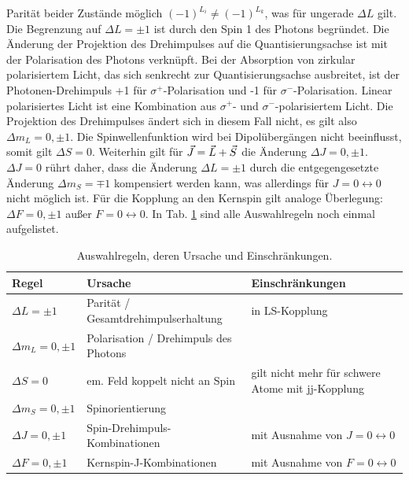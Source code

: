 Parität beider Zustände möglich $(-1)^{L_i}\neq(-1)^{L_k}$, was für ungerade
$\Delta L$ gilt. Die Begrenzung auf $\Delta L=\pm1$ ist durch den Spin 1 des
Photons begründet. Die Änderung der Projektion des Drehimpulses auf die
Quantisierungsachse ist mit der Polarisation des Photons verknüpft. Bei der
Absorption von zirkular polarisiertem Licht, das sich senkrecht zur
Quantisierungsachse ausbreitet, ist der Photonen-Drehimpuls +1 für
$\sigma^+$-Polarisation und -1 für $\sigma^-$-Polarisation. Linear polarisiertes
Licht ist eine Kombination aus $\sigma^+$- und $\sigma^-$-polarisiertem Licht.
Die Projektion des Drehimpulses ändert sich in diesem Fall nicht, es gilt also
$\Delta m_L = 0, \pm1$. Die Spinwellenfunktion wird bei Dipolübergängen nicht
beeinflusst, somit gilt $\Delta S=0$. Weiterhin gilt für $\vec{J}=\vec{L}+\vec{S}$ die
Änderung $\Delta J=0,\pm1$. $\Delta J=0$ rührt daher, dass die Änderung $\Delta
L=\pm1$ durch die entgegengesetzte Änderung $\Delta m_S=\mp1$ kompensiert
werden kann, was allerdings für $J=0\leftrightarrow0$ nicht möglich ist. Für die
Kopplung an den Kernspin gilt analoge Überlegung: $\Delta F = 0, \pm1$ außer
$F=0\leftrightarrow0$. In Tab. \ref{tab:auswahlregeln} sind alle Auswahlregeln
noch einmal aufgelistet.

\begin{table}
	\begin{tabular}{p{}p{}p{}}
		\toprule
		Regel & Ursache & Einschränkungen \\
		\midrule[1px]
		\hline
		$\Delta L = \pm1$ & Parität / Gesamtdrehimpulserhaltung & in LS-Kopplung \\
		$\Delta m_L = 0, \pm1$ & Polarisation / Drehimpuls des Photons & \\
		$\Delta S = 0$ & em. Feld koppelt nicht an Spin & gilt nicht mehr für
		schwere Atome mit jj-Kopplung \\
		$\Delta m_S = 0, \pm1$ & Spinorientierung & \\
		$\Delta J = 0, \pm1$ & Spin-Drehimpuls-Kombinationen & mit Ausnahme von
		$J=0\leftrightarrow0$
		\\
		$\Delta F = 0, \pm1$ & Kernspin-J-Kombinationen & mit Ausnahme von
		$F=0\leftrightarrow0$
		\\
		\bottomrule[1px]
	\end{tabular}
	\caption[Auswahlregeln]{Auswahlregeln, deren Ursache und Einschränkungen.}
	\label{tab:auswahlregeln}
\end{table}



